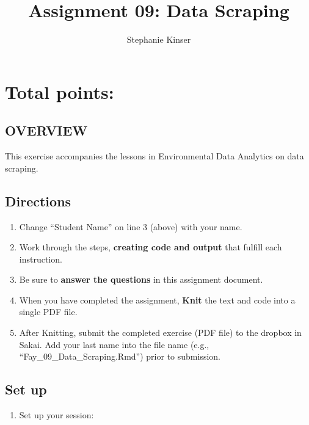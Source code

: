 \documentclass[
]{article}
\title{Assignment 09: Data Scraping}
\author{Stephanie Kinser}
\date{}
\providecommand{\tightlist}{%
  \setlength{\itemsep}{0pt}\setlength{\parskip}{0pt}}
\begin{document}
\maketitle

\hypertarget{total-points}{%
\section{Total points:}\label{total-points}}

\hypertarget{overview}{%
\subsection{OVERVIEW}\label{overview}}

This exercise accompanies the lessons in Environmental Data Analytics on
data scraping.

\hypertarget{directions}{%
\subsection{Directions}\label{directions}}

\begin{enumerate}
\def\labelenumi{\arabic{enumi}.}
\tightlist
\item
  Change ``Student Name'' on line 3 (above) with your name.
\item
  Work through the steps, \textbf{creating code and output} that fulfill
  each instruction.
\item
  Be sure to \textbf{answer the questions} in this assignment document.
\item
  When you have completed the assignment, \textbf{Knit} the text and
  code into a single PDF file.
\item
  After Knitting, submit the completed exercise (PDF file) to the
  dropbox in Sakai. Add your last name into the file name (e.g.,
  ``Fay\_09\_Data\_Scraping.Rmd'') prior to submission.
\end{enumerate}

\hypertarget{set-up}{%
\subsection{Set up}\label{set-up}}

\begin{enumerate}
\def\labelenumi{\arabic{enumi}.}
\tightlist
\item
  Set up your session:
\end{enumerate}
\end{document}
